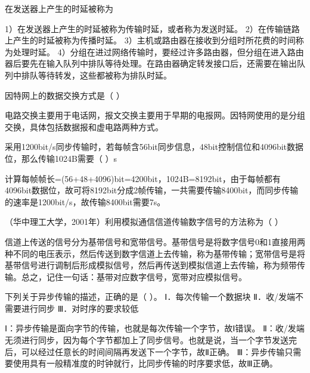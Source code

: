 \question 在发送器上产生的时延被称为
\par{}
\begin{solution}1）在发送器上产生的时延被称为传输时延，或者称为发送时延。
2）在传输链路上产生的时延被称为传播时延。
3）主机或路由器在接收到分组时所花费的时间称为处理时延。
4）分组在进过网络传输时，要经过许多路由器，但分组在进入路由器后要先在输入队列中排队等待处理。在路由器确定转发接口后，还需要在输出队列中排队等待转发，这些都被称为排队时延。
\end{solution}
\question 因特网上的数据交换方式是（ ）
\par{}
\begin{solution}电路交换主要用于电话网，报文交换主要用于早期的电报网。因特网使用的是分组交换，具体包括数据报和虚电路两种方式。
\end{solution}
\question 采用1200bit/s同步传输时，若每帧含56bit同步信息，48bit控制信位和4096bit数据位，那么传输1024B需要（
）s
\par{}
\begin{solution}计算每帧帧长=(56+48+4096)bit=4200bit，1024B=8192bit，由于每帧都有4096bit数据位，故可将8192bit分成2帧传输，一共需要传输8400bit，而同步传输的速率是1200bit/s，故传输8400bit需要7s。
\end{solution}
\question （华中理工大学，2001年）利用模拟通信信道传输数字信号的方法称为（ ）
\par{}
\begin{solution}信道上传送的信号分为基带信号和宽带信号。基带信号是将数字信号0和1直接用两种不同的电压表示，然后传送到数字信道上去传输，称为基带传输；宽带信号是将基带信号进行调制后形成模拟信号，然后再传送到模拟信道上去传输，称为频带传输。总之，记住一句话：基带对应数字信号，宽带对应模拟信号。
\end{solution}
\question 下列关于异步传输的描述，正确的是（ ）。 Ⅰ．每次传输一个数据块
Ⅱ．收/发端不需要进行同步 Ⅲ．对时序的要求较低
\par{}
\begin{solution}Ⅰ：异步传输是面向字节的传输，也就是每次传输一个字节，故Ⅰ错误。
Ⅱ：收/发端无须进行同步，因为每个字节都加上了同步信号。也就是说，当一个字节发送完后，可以经过任意长的时间间隔再发送下一个字节，故Ⅱ正确。
Ⅲ：异步传输只需要使用具有一般精准度的时钟就行，比同步传输的时序要求低，故Ⅲ正确。
\end{solution}
